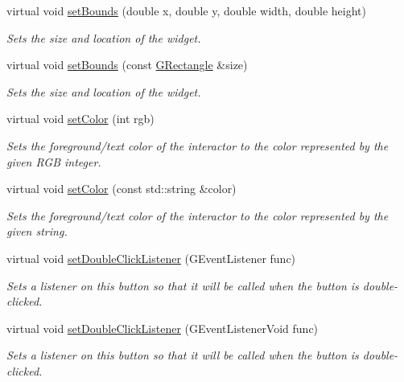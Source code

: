 \begin{DoxyCompactItemize}
virtual void \mbox{\hyperlink{classGInteractor_a2aae8197624b72265ab83b4f1bc73f2f}{set\+Bounds}} (double x, double y, double width, double height)
\begin{DoxyCompactList}\small\item\em Sets the size and location of the widget. \end{DoxyCompactList}\item 
virtual void \mbox{\hyperlink{classGInteractor_acada386653f008cacc7cce86426bef7c}{set\+Bounds}} (const \mbox{\hyperlink{classGRectangle}{G\+Rectangle}} \&size)
\begin{DoxyCompactList}\small\item\em Sets the size and location of the widget. \end{DoxyCompactList}\item 
virtual void \mbox{\hyperlink{classGInteractor_ab1f5cc0f5cc6bbbd716a526c61f1081d}{set\+Color}} (int rgb)
\begin{DoxyCompactList}\small\item\em Sets the foreground/text color of the interactor to the color represented by the given R\+GB integer. \end{DoxyCompactList}\item 
virtual void \mbox{\hyperlink{classGInteractor_a61374df6c11b52cfbb0815decdbaebc6}{set\+Color}} (const std\+::string \&color)
\begin{DoxyCompactList}\small\item\em Sets the foreground/text color of the interactor to the color represented by the given string. \end{DoxyCompactList}\item 
virtual void \mbox{\hyperlink{classGButton_ac29f9a3462458e165fae3a1f046ee77a}{set\+Double\+Click\+Listener}} (G\+Event\+Listener func)
\begin{DoxyCompactList}\small\item\em Sets a listener on this button so that it will be called when the button is double-\/clicked. \end{DoxyCompactList}\item 
virtual void \mbox{\hyperlink{classGButton_a50096194d66f48c92dd4c512d41bfc76}{set\+Double\+Click\+Listener}} (G\+Event\+Listener\+Void func)
\begin{DoxyCompactList}\small\item\em Sets a listener on this button so that it will be called when the button is double-\/clicked. \end{DoxyCompactList}\item 

\end{DoxyCompactItemize}
